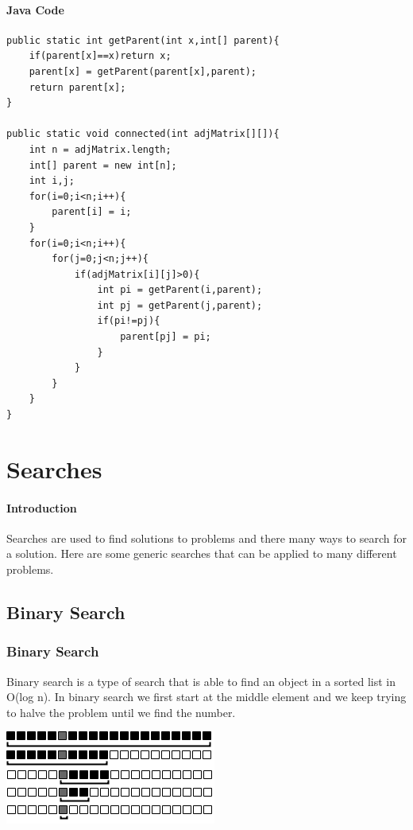 \documentclass[11pt,oneside]{book}
\makeatletter
\def\maxwidth#1{\ifdim\Gin@nat@width>#1 #1\else\Gin@nat@width\fi}
\makeatother
\begin{document}
\subsubsection{Java Code}

\begin{lstlisting}
public static int getParent(int x,int[] parent){
    if(parent[x]==x)return x;
    parent[x] = getParent(parent[x],parent);
    return parent[x];
}
    
public static void connected(int adjMatrix[][]){
    int n = adjMatrix.length;
    int[] parent = new int[n];
    int i,j;
    for(i=0;i<n;i++){
        parent[i] = i;
    }
    for(i=0;i<n;i++){
        for(j=0;j<n;j++){
            if(adjMatrix[i][j]>0){
                int pi = getParent(i,parent);
                int pj = getParent(j,parent);
                if(pi!=pj){
                    parent[pj] = pi;
                }
            }
        }
    }   
}
\end{lstlisting}
\chapter{Searches}\subsubsection{Introduction}

Searches are used to find solutions to problems and there many ways to search for a solution. Here are some generic searches that can be applied to many different problems.

\section{Binary Search}\subsection{Binary Search}

Binary search is a type of search that is able to find an object in a sorted list in O(log n). In binary search we first start at the middle element and we keep trying to halve the problem until we find the number.

\includegraphics[width=\maxwidth{\textwidth}]{binarysearch.png}
\end{document}
